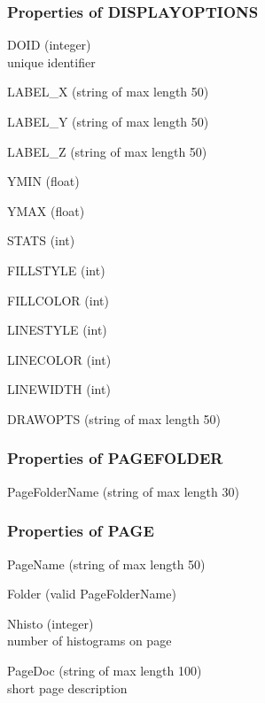 \documentclass{lhcbnote}
\begin{document}
\subsubsection{Properties of DISPLAYOPTIONS}\label{dispopts}
\begin{description}
\item{DOID} (integer)\\
unique identifier 
\item{LABEL\_X}  (string of max length 50)
\item{LABEL\_Y}  (string of max length 50)
\item{LABEL\_Z}  (string of max length 50)
\item{YMIN} (float)
\item{YMAX} (float)
\item{STATS} (int)
\item{FILLSTYLE} (int)
\item{FILLCOLOR} (int)
\item{LINESTYLE} (int)
\item{LINECOLOR} (int)
\item{LINEWIDTH} (int)
\item{DRAWOPTS}  (string of max length 50)
\end{description}
\subsubsection{Properties of PAGEFOLDER}
\begin{description}
\item{PageFolderName} (string of max length 30)
\end{description}

\subsubsection{Properties of PAGE}
\begin{description}
\item{PageName} (string of max length 50)
\item{Folder} (valid PageFolderName) \\
\item{Nhisto} (integer) \\
number of histograms on page
\item{PageDoc} (string of max length 100)\\
short page description
\end{description}
\end{document}
